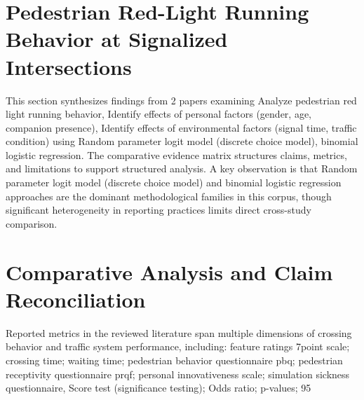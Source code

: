 \documentclass{article}
\begin{document}
\section{Pedestrian Red-Light Running Behavior at Signalized Intersections}
This section synthesizes findings from 2 papers examining Analyze pedestrian red light running behavior, Identify effects of personal factors (gender, age, companion presence), Identify effects of environmental factors (signal time, traffic condition) using Random parameter logit model (discrete choice model), binomial logistic regression. The comparative evidence matrix structures claims, metrics, and limitations to support structured analysis. A key observation is that Random parameter logit model (discrete choice model) and binomial logistic regression approaches are the dominant methodological families in this corpus, though significant heterogeneity in reporting practices limits direct cross-study comparison.

\section{Comparative Analysis and Claim Reconciliation}
Reported metrics in the reviewed literature span multiple dimensions of crossing behavior and traffic system performance, including: feature ratings 7point scale; crossing time; waiting time; pedestrian behavior questionnaire pbq; pedestrian receptivity questionnaire prqf; personal innovativeness scale; simulation sickness questionnaire, Score test (significance testing); Odds ratio; p-values; 95%
\end{document}
